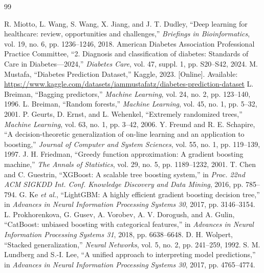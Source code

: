 \clearpage
{}
{}
\renewcommand{\bibname}{REFERENCES}
\begin{singlespace}
\begin{thebibliography}{99}
\setlength{\itemsep}{4pt}
\fontsize{11.5}{14}\selectfont

 R. Miotto, L. Wang, S. Wang, X. Jiang, and J. T. Dudley, ``Deep learning for healthcare: review, opportunities and challenges,'' \emph{Briefings in Bioinformatics}, vol. 19, no. 6, pp. 1236–1246, 2018.
 American Diabetes Association Professional Practice Committee, ``2. Diagnosis and classification of diabetes: Standards of Care in Diabetes—2024,'' \emph{Diabetes Care}, vol. 47, suppl. 1, pp. S20–S42, 2024.
 M. Mustafa, ``Diabetes Prediction Dataset,'' Kaggle, 2023. [Online]. Available: \url{https://www.kaggle.com/datasets/iammustafatz/diabetes-prediction-dataset}
 L. Breiman, ``Bagging predictors,'' \emph{Machine Learning}, vol. 24, no. 2, pp. 123–140, 1996.
 L. Breiman, ``Random forests,'' \emph{Machine Learning}, vol. 45, no. 1, pp. 5–32, 2001.
 P. Geurts, D. Ernst, and L. Wehenkel, ``Extremely randomized trees,'' \emph{Machine Learning}, vol. 63, no. 1, pp. 3–42, 2006.
 Y. Freund and R. E. Schapire, ``A decision-theoretic generalization of on-line learning and an application to boosting,'' \emph{Journal of Computer and System Sciences}, vol. 55, no. 1, pp. 119–139, 1997.
 J. H. Friedman, ``Greedy function approximation: A gradient boosting machine,'' \emph{The Annals of Statistics}, vol. 29, no. 5, pp. 1189–1232, 2001.
 T. Chen and C. Guestrin, ``XGBoost: A scalable tree boosting system,'' in \emph{Proc. 22nd ACM SIGKDD Int. Conf. Knowledge Discovery and Data Mining}, 2016, pp. 785–794.
 G. Ke \emph{et al.}, ``LightGBM: A highly efficient gradient boosting decision tree,'' in \emph{Advances in Neural Information Processing Systems 30}, 2017, pp. 3146–3154.
 L. Prokhorenkova, G. Gusev, A. Vorobev, A. V. Dorogush, and A. Gulin, ``CatBoost: unbiased boosting with categorical features,'' in \emph{Advances in Neural Information Processing Systems 31}, 2018, pp. 6638–6648.
 D. H. Wolpert, ``Stacked generalization,'' \emph{Neural Networks}, vol. 5, no. 2, pp. 241–259, 1992.
 S. M. Lundberg and S.-I. Lee, ``A unified approach to interpreting model predictions,'' in \emph{Advances in Neural Information Processing Systems 30}, 2017, pp. 4765–4774.

\end{thebibliography}
\end{singlespace}

